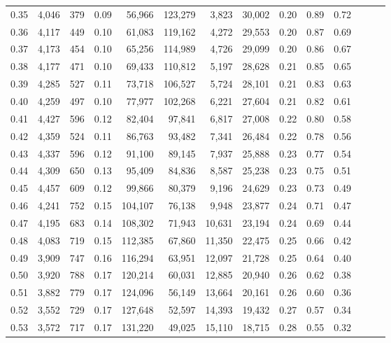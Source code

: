 \begin{tabular}{rrrrrrrrrrrrrr}
0.35 &  4,046 &  379 &  0.09 &   56,966 &  123,279 &   3,823 &  30,002 &  0.20 &  0.89 &      0.72 \\
0.36 &  4,117 &  449 &  0.10 &   61,083 &  119,162 &   4,272 &  29,553 &  0.20 &  0.87 &      0.69 \\
0.37 &  4,173 &  454 &  0.10 &   65,256 &  114,989 &   4,726 &  29,099 &  0.20 &  0.86 &      0.67 \\
0.38 &  4,177 &  471 &  0.10 &   69,433 &  110,812 &   5,197 &  28,628 &  0.21 &  0.85 &      0.65 \\
0.39 &  4,285 &  527 &  0.11 &   73,718 &  106,527 &   5,724 &  28,101 &  0.21 &  0.83 &      0.63 \\
0.40 &  4,259 &  497 &  0.10 &   77,977 &  102,268 &   6,221 &  27,604 &  0.21 &  0.82 &      0.61 \\
0.41 &  4,427 &  596 &  0.12 &   82,404 &   97,841 &   6,817 &  27,008 &  0.22 &  0.80 &      0.58 \\
0.42 &  4,359 &  524 &  0.11 &   86,763 &   93,482 &   7,341 &  26,484 &  0.22 &  0.78 &      0.56 \\
0.43 &  4,337 &  596 &  0.12 &   91,100 &   89,145 &   7,937 &  25,888 &  0.23 &  0.77 &      0.54 \\
0.44 &  4,309 &  650 &  0.13 &   95,409 &   84,836 &   8,587 &  25,238 &  0.23 &  0.75 &      0.51 \\
0.45 &  4,457 &  609 &  0.12 &   99,866 &   80,379 &   9,196 &  24,629 &  0.23 &  0.73 &      0.49 \\
0.46 &  4,241 &  752 &  0.15 &  104,107 &   76,138 &   9,948 &  23,877 &  0.24 &  0.71 &      0.47 \\
0.47 &  4,195 &  683 &  0.14 &  108,302 &   71,943 &  10,631 &  23,194 &  0.24 &  0.69 &      0.44 \\
0.48 &  4,083 &  719 &  0.15 &  112,385 &   67,860 &  11,350 &  22,475 &  0.25 &  0.66 &      0.42 \\
0.49 &  3,909 &  747 &  0.16 &  116,294 &   63,951 &  12,097 &  21,728 &  0.25 &  0.64 &      0.40 \\
0.50 &  3,920 &  788 &  0.17 &  120,214 &   60,031 &  12,885 &  20,940 &  0.26 &  0.62 &      0.38 \\
0.51 &  3,882 &  779 &  0.17 &  124,096 &   56,149 &  13,664 &  20,161 &  0.26 &  0.60 &      0.36 \\
0.52 &  3,552 &  729 &  0.17 &  127,648 &   52,597 &  14,393 &  19,432 &  0.27 &  0.57 &      0.34 \\
0.53 &  3,572 &  717 &  0.17 &  131,220 &   49,025 &  15,110 &  18,715 &  0.28 &  0.55 &      0.32 \\

\end{tabular}
